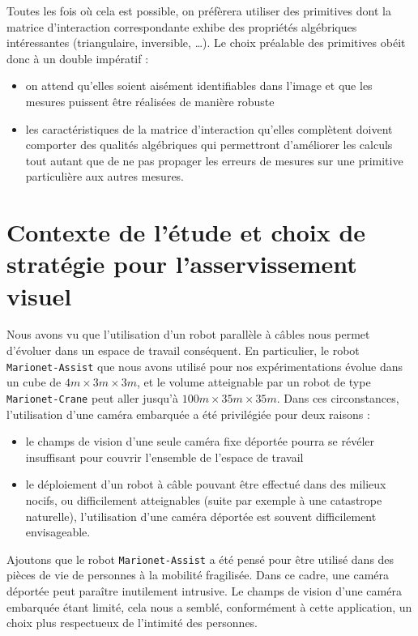 Toutes les fois où cela est possible, on préfèrera utiliser des primitives dont 
la matrice d'interaction correspondante exhibe des propriétés algébriques 
inté\-ressantes (triangulaire, inversible, \dots). Le choix préalable des 
primitives obéit donc à un double impératif :
\begin{itemize}
 \item on attend qu'elles soient aisément identifiables dans l'image et que les 
mesures puissent être réalisées de manière robuste
 \item les caractéristiques de la matrice d'interaction qu'elles complètent 
doivent comporter des qualités algébriques qui permettront d'améliorer les 
calculs tout autant que de ne pas propager les erreurs de mesures sur une 
primitive particulière aux autres mesures.
\end{itemize}


\section{Contexte de l'étude et choix de stratégie pour l'asser\-vissement 
visuel}\label{chap1-2}

Nous avons vu que l'utilisation d'un robot parallèle à câbles nous permet 
d'évoluer dans un espace de travail conséquent. En particulier, le robot {\tt 
Marionet-Assist} que nous avons utilisé pour nos expérimentations évolue dans 
un cube de $4m \times 3m \times 3m$, et le volume atteignable par un robot de type 
{\tt Marionet-Crane} peut aller jusqu'à $100m \times 35m \times 35m$. Dans ces 
circonstances, l'utilisation d'une caméra embarquée a été privilégiée pour deux 
raisons :
\begin{itemize}
 \item le champs de vision d'une seule caméra fixe déportée pourra se révéler 
insuffisant pour couvrir l'ensemble de l'espace de travail
 \item le déploiement d'un robot à câble pouvant être effectué dans des milieux 
nocifs, ou difficilement atteignables (suite par exemple à une catastrope 
naturelle), l'utilisation d'une caméra déportée est souvent difficilement 
envisageable.
\end{itemize}

Ajoutons que le robot {\tt Marionet-Assist} a été pensé pour être utilisé dans 
des pièces de vie de personnes à la mobilité fragilisée. Dans ce cadre, une 
caméra déportée peut paraître inutilement intrusive. Le champs de vision d'une 
caméra embarquée étant limité, cela nous a semblé, conformément à cette 
application, un choix plus respectueux de l'intimité des personnes. 

